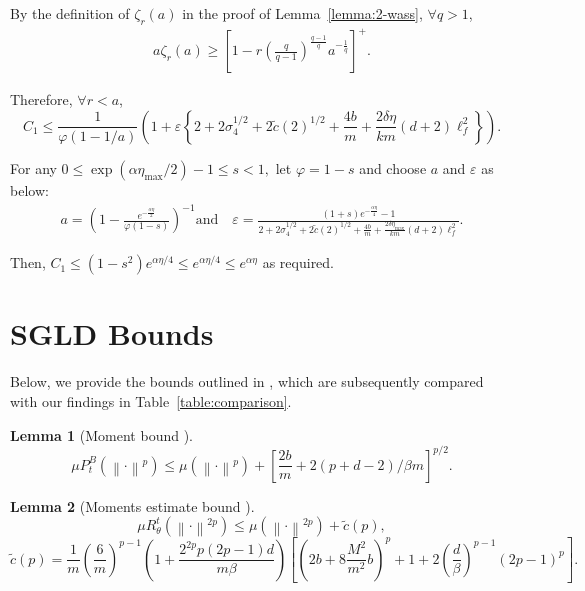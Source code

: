 \documentclass{article}
\newcommand{\norm}[1]{\left\lVert#1\right\rVert} %
\newtheorem{lemma}{Lemma}
\begin{document}
By the definition of $\zeta_r (a)$ in the proof of Lemma~\ref{lemma:2-wass}, $\forall q > 1$,
    \begin{align*}
        a \zeta_r (a) \geq \left[1-r(\frac{q}{q-1})^{\frac{q-1}{q}}a^{-\frac{1}{q}}\right]^+.
    \end{align*}

Therefore, $\forall r < a$,
$$C_1 \leq \frac{1}{\varphi (1-1/a)} \left(1 + \varepsilon \left\{ 2 + 2\sigma_4^{1/2} +2\tilde{c}(2)^{1/2} + \frac{4b}{m} + \frac{2\delta \eta}{km} (d +2) \ell_f^2 \right\}\right).$$

For any $0 \leq \exp(\alpha \eta_{\max} /2) - 1 \leq s < 1,$ let $\varphi = 1-s$ and choose $a$ and $\varepsilon$ as below:
\begin{align}
    a = \left(1 - \frac{e^{-\frac{\alpha \eta}{2}}}{\varphi (1-s)} \right)^{-1} \text{and} 
    \quad \varepsilon = \frac{(1+s) e^{-\frac{\alpha \eta}{4}} - 1}{ 2 + 2\sigma_4^{1/2} +2\tilde{c}(2)^{1/2} + \frac{4b}{m} + \frac{2\delta \eta_{\max}}{km} (d +2) \ell_f^2}.\label{eq:epsilon}
\end{align}

Then, $C_1 \leq (1-s^2)e^{\alpha \eta / 4} \leq e^{\alpha\eta/4} \leq e^{\alpha\eta}$ as required.

\iffalse
By letting 
\begin{align}
    a = \left(1 - \frac{e^{-\frac{\alpha \eta}{4}}}{\varphi} \right)^{-1} \text{and} 
    \quad \varepsilon = \frac{e^{\frac{\alpha \eta}{4}} - 1}{ 2 + 2\sigma_4^{1/2} +2\tilde{c}(2)^{1/2} + \frac{4b}{m} + \frac{2\delta \eta_{\max}}{km} (d +2) \ell_f^2},\label{eq:epsilon}
\end{align}
we have $C_1 = e^{\alpha \eta /2}\leq e^{\alpha \eta}$ as required.
\fi

\section{SGLD Bounds}

Below, we provide the bounds outlined in \citet{Farghly}, which are subsequently compared with our findings in Table~\ref{table:comparison}.

\begin{lemma}[Moment bound {\citep[Lemma A.1]{Farghly}}]
$$\mu P_t^B (\norm{\cdot}^p) \leq  \mu (\norm{\cdot}^p) + \left[\frac{2b}{m} + 2(p+d-2)/\beta m\right]^{p/2}.$$
\end{lemma}

\begin{lemma}[Moments estimate bound {\citep[Lemma B.2]{Farghly}}]
$$\mu R_\theta^t (\norm{\cdot}^{2p}) \leq \mu (\norm{\cdot}^{2p}) + \tilde{c}(p),$$
		$$\tilde{c}(p) = \frac{1}{m} \left(\frac{6}{m}\right)^{p-1} \left( 1 + \frac{2^{2p} p (2p-1) d }{m\beta} \right) \left[\left(2b + 8 \frac{M^2}{m^2} b \right)^p + 1 + 2 \left(\frac{d}{\beta}\right)^{p-1} (2p-1)^p \right].$$
\end{lemma}
  
\end{document}

